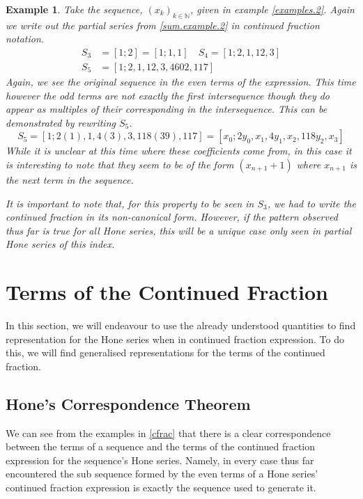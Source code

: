 \documentclass{article}
\newtheorem{example}{Example}[section]
\theoremstyle{remark}
\theoremstyle{definition}
\begin{document}
\begin{example}\label{cfrac.example.2}
Take the sequence, $(x_k)_{k\in\mathbb{N}}$, given in example \ref{examples.2}. Again we write out the partial series from \ref{sum.example.2} in continued fraction notation.
\begin{align*}
    S_3 &= [1;2] = [1;1,1] \quad S_4 = [1;2,1,12,3] \\
    S_5 &= [1;2,1,12,3,4602,117]
\end{align*}
Again, we see the original sequence in the even terms of the expression. This time however the odd terms are not exactly the first intersequence though they do appear as multiples of their corresponding in the intersequence. This can be demonstrated by rewriting $S_5$.
\begin{equation}
    S_5 = [1;2(1),1,4(3),3,118(39),117] = [x_0;2y_0,x_1,4y_1,x_2,118y_2,x_3]
\end{equation}
While it is unclear at this time where these coefficients come from, in this case it is interesting to note that they seem to be of the form $(x_{n+1} + 1)$ where $x_{n+1}$ is the next term in the sequence.

It is important to note that, for this property to be seen in $S_3$, we had to write the continued fraction in its non-canonical form. However, if the pattern observed thus far is true for all Hone series, this will be a unique case only seen in partial Hone series of this index.
\end{example}

\section{Terms of the Continued Fraction}
In this section, we will endeavour to use the already understood quantities to find representation for the Hone series when in continued fraction expression. To do this, we will find generalised representations for the terms of the continued fraction.

\subsection{Hone's Correspondence Theorem}\label{correspondence}
We can see from the examples in \ref{cfrac} that there is a clear correspondence between the terms of a sequence and the terms of the continued fraction expression for the sequence's Hone series. Namely, in every case thus far encountered the sub sequence formed by the even terms of a Hone series' continued fraction expression is exactly the sequence used to generate it.
\end{document}
